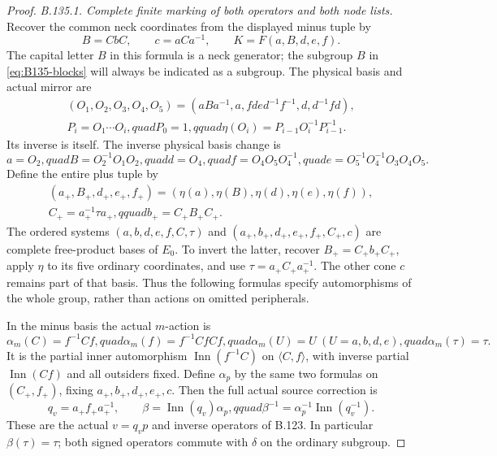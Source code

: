 \begin{proof}
\emph{B.135.1. Complete finite marking of both operators and both node lists.}
Recover the common neck coordinates from the displayed minus tuple by
\[
 B=CbC,\qquad c=aCa^{-1},\qquad K=F(a,B,d,e,f).
\]
The capital letter $B$ in this formula is a neck generator; the subgroup
$B$ in \eqref{eq:B135-blocks} will always be indicated as a subgroup.
The physical basis and actual mirror are
\begin{equation}\label{eq:B135-mirror}
 \begin{gathered}
 (O_1,O_2,O_3,O_4,O_5)
 =(aBa^{-1},a,fde d^{-1}f^{-1},d,d^{-1}fd),\\
 P_i=O_1\cdots O_i,quad P_0=1,qquad
 \eta(O_i)=P_{i-1}O_i^{-1}P_{i-1}^{-1}.
 \end{gathered}
\end{equation}
Its inverse is itself. The inverse physical basis change is
\[
 a=O_2,quad B=O_2^{-1}O_1O_2,quad d=O_4,quad
 f=O_4O_5O_4^{-1},quad e=O_5^{-1}O_4^{-1}O_3O_4O_5.
\]
Define the entire plus tuple by
\begin{equation}\label{eq:B135-plus-tuple}
 \begin{gathered}
 (a_+,B_+,d_+,e_+,f_+)
       =(\eta(a),\eta(B),\eta(d),\eta(e),\eta(f)),\\
 C_+=a_+^{-1}\tau a_+,qquad b_+=C_+B_+C_+.
 \end{gathered}
\end{equation}
The ordered systems $(a,b,d,e,f,C,\tau)$ and
$(a_+,b_+,d_+,e_+,f_+,C_+,c)$ are complete free-product bases
of $E_0$. To invert the latter, recover $B_+=C_+b_+C_+$,
apply $\eta$ to its five ordinary coordinates, and use
$\tau=a_+C_+a_+^{-1}$. The other cone $c$ remains part of
that basis. Thus the following formulas specify automorphisms
of the whole group, rather than actions on omitted peripherals.

In the minus basis the actual $m$-action is
\begin{equation}\label{eq:B135-m-action}
 \alpha_m(C)=f^{-1}Cf,quad
 \alpha_m(f)=f^{-1}CfCf,quad
 \alpha_m(U)=U\ (U=a,b,d,e),quad \alpha_m(\tau)=\tau.
\end{equation}
It is the partial inner automorphism $\operatorname{Inn}(f^{-1}C)$
on $\langle C,f\rangle$, with inverse partial
$\operatorname{Inn}(Cf)$ and all outsiders fixed.
Define $\alpha_p$ by the same two formulas on
$(C_+,f_+)$, fixing $a_+,b_+,d_+,e_+,c$.
Then the full actual source correction is
\begin{equation}\label{eq:B135-beta}
 q_v=a_+f_+a_+^{-1},\qquad
 \beta=\operatorname{Inn}(q_v)\alpha_p,qquad
 \beta^{-1}=\alpha_p^{-1}\operatorname{Inn}(q_v^{-1}).
\end{equation}
These are the actual $v=q_vp$ and inverse operators of B.123.
In particular $\beta(\tau)=\tau$; both signed operators
commute with $\delta$ on the ordinary subgroup.


\end{proof}
